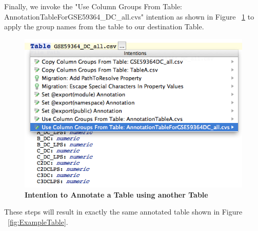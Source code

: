 Finally, we invoke the "Use Column Groups From Table: AnnotationTableForGSE59364\_DC\_all.cvs" intention as shown in Figure ~\ref{fig:AnnotateTableIntention} to apply the group names from the table to our destination Table. 
\begin{figure}[h!tbp]
  \centering
  \includegraphics[width=\figWidthWide]{figures/AnnotateTableIntention.png}
\caption[Intention to Annotate a Table using another Table]{\textbf{Intention to Annotate a Table using another Table} }
\label{fig:AnnotateTableIntention}
\end{figure}

These steps will result in exactly the same annotated table shown in Figure ~\ref{fig:ExampleTable}.